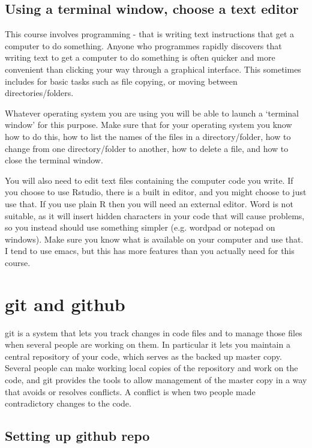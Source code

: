 \documentclass[10pt] {article}
\theoremstyle{definition}
\begin{document}
\subsection{Using a terminal window, choose a text editor}

This course involves programming - that is writing text instructions that get a computer to do something. Anyone who programmes rapidly discovers that writing text to get a computer to do something is often quicker and more convenient than clicking your way through a graphical interface. This sometimes includes for basic tasks such as file copying, or moving between directories/folders. 

Whatever operating system you are using you will be able to launch a `terminal window' for this purpose. Make sure that for your operating system you know how to do this, how to list the names of the files in a directory/folder, how to change from one directory/folder to another, how to delete a file, and how to close the terminal window. 

You will also need to edit text files containing the computer code you write. If you choose to use Rstudio, there is a built in editor, and you might choose to just use that. If you use plain R then you will need an external editor. Word is not suitable, as it will insert hidden characters in your code that will cause problems, so you instead should use something simpler (e.g. wordpad or notepad on windows). Make sure you know what is available on your computer and use that. I tend to use emacs, but this has more features than you actually need for this course. 

\section{git and github}

git is a system that lets you track changes in code files and to manage those files when several people are working on them. In particular it lets you maintain a central repository of your code, which serves as the backed up master copy. Several people can make working local copies of the repository and work on the code, and git provides the tools to allow management of the master copy in a way that avoids or resolves conflicts. A conflict is when two people made contradictory changes to the code.  

\subsection{Setting up github repo}
\end{document}

